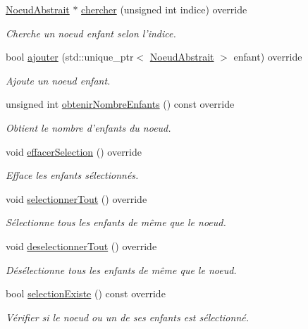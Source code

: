 \begin{DoxyCompactItemize}
\hyperlink{class_noeud_abstrait}{Noeud\-Abstrait} $\ast$ \hyperlink{group__inf2990_ga9f6cf297ac93d75711e1ae85cb0a69ed}{chercher} (unsigned int indice) override
\begin{DoxyCompactList}\small\item\em Cherche un noeud enfant selon l'indice. \end{DoxyCompactList}\item 
bool \hyperlink{group__inf2990_ga5651862ed875690375d9a82a06ecdcb2}{ajouter} (std\-::unique\-\_\-ptr$<$ \hyperlink{class_noeud_abstrait}{Noeud\-Abstrait} $>$ enfant) override
\begin{DoxyCompactList}\small\item\em Ajoute un noeud enfant. \end{DoxyCompactList}\item 
unsigned int \hyperlink{group__inf2990_gae7d523ed724c9cf692bf00dd93226e9c}{obtenir\-Nombre\-Enfants} () const override
\begin{DoxyCompactList}\small\item\em Obtient le nombre d'enfants du noeud. \end{DoxyCompactList}\item 
void \hyperlink{group__inf2990_ga7e3aa1018378eb5e0342b2fe530783cc}{effacer\-Selection} () override
\begin{DoxyCompactList}\small\item\em Efface les enfants sélectionnés. \end{DoxyCompactList}\item 
void \hyperlink{group__inf2990_ga1fb05aa01553f1fa6738711ab172efb6}{selectionner\-Tout} () override
\begin{DoxyCompactList}\small\item\em Sélectionne tous les enfants de même que le noeud. \end{DoxyCompactList}\item 
void \hyperlink{group__inf2990_ga98d6f93f7dc06301f8909e8cf31e3e9e}{deselectionner\-Tout} () override
\begin{DoxyCompactList}\small\item\em Désélectionne tous les enfants de même que le noeud. \end{DoxyCompactList}\item 
bool \hyperlink{group__inf2990_gaa62702a8268ba37e973de9c6900e361d}{selection\-Existe} () const override
\begin{DoxyCompactList}\small\item\em Vérifier si le noeud ou un de ses enfants est sélectionné. \end{DoxyCompactList}\item 

\end{DoxyCompactItemize}
